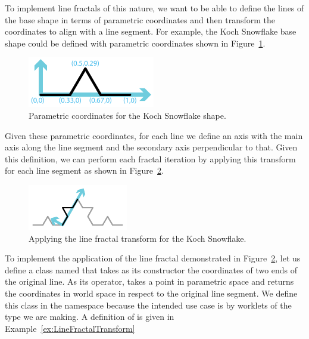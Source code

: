 To implement line fractals of this nature, we want to be able to define the lines of the base shape in terms of parametric coordinates and then transform the coordinates to align with a line segment.
For example, the Koch Snowflake base shape could be defined with parametric coordinates shown in Figure~\ref{fig:KochParametric}.

\begin{figure}[htb]
  \centering
  \includegraphics[scale=2]{images/KochParametric}
  \caption{Parametric coordinates for the Koch Snowflake shape.}
  \label{fig:KochParametric}
\end{figure}

Given these parametric coordinates, for each line we define an axis with the main axis along the line segment and the secondary axis perpendicular to that.
Given this definition, we can perform each fractal iteration by applying this transform for each line segment as shown in Figure~\ref{fig:KochApply}.

\begin{figure}[htb]
  \centering
  \includegraphics[scale=2]{images/KochApply}
  \caption{Applying the line fractal transform for the Koch Snowflake.}
  \label{fig:KochApply}
\end{figure}

To implement the application of the line fractal demonstrated in Figure~\ref{fig:KochApply}, let us define a class named  that takes as its constructor the coordinates of two ends of the original line.
As its operator,  takes a point in parametric space and returns the coordinates in world space in respect to the original line segment.
We define this class in the \vtkmexec{} namespace because the intended use case is by worklets of the type we are making.
A definition of  is given in Example~\ref{ex:LineFractalTransform}


